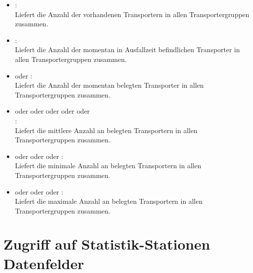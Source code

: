 \begin{itemize}
  
\item
{}:\\
Liefert die Anzahl der vorhandenen Transportern in allen Transportergruppen zusammen.
  
\item
{}:\\
Liefert die Anzahl der momentan in Ausfallzeit befindlichen Transporter in allen Transportergruppen zusammen. 

\item
{} oder :\\
Liefert die Anzahl der momentan belegten Transporter in allen Transportergruppen zusammen.
  
\item
{} oder  oder  oder  oder  oder\\
:\\
Liefert die mittlere Anzahl an belegten Transportern in allen Transportergruppen zusammen.
  
\item
{} oder  oder  oder :\\
Liefert die minimale Anzahl an belegten Transportern in allen Transportergruppen zusammen.
  
\item
{} oder  oder  oder :\\
Liefert die maximale Anzahl an belegten Transportern in allen Transportergruppen zusammen.

\end{itemize}



\section{Zugriff auf Statistik-Stationen Datenfelder}


